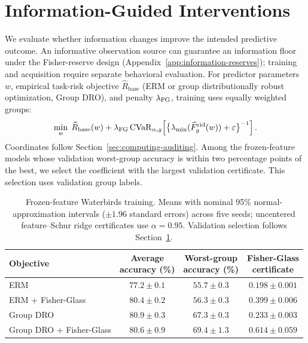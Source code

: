 \section{Information-Guided Interventions}
\label{sec:improving-information}

We evaluate whether information changes improve the intended predictive outcome. An informative observation source can guarantee an information floor under the Fisher-reserve design \citep{mansouri_arai_2026_fisher_glasses} (Appendix~\ref{app:information-reserves}); training and acquisition require separate behavioral evaluation. For predictor parameters $w$, empirical task-risk objective $\widehat R_{\mathrm{base}}$ (ERM or group distributionally robust optimization, Group DRO), and penalty $\lambda_{\mathrm{FG}}$, training uses equally weighted groups:
\begin{equation}
\min_w\;\widehat R_{\mathrm{base}}(w)
+\lambda_{\mathrm{FG}}\operatorname{CVaR}_{\alpha,g}
\!\left[\bigl\{\lambda_{\min}(\widehat F_g^{\mathrm{rid}}(w))+\varepsilon\bigr\}^{-1}\right].
\label{eq:fg-training-compact}
\end{equation}
Coordinates follow Section~\ref{sec:computing-auditing}. Among the frozen-feature models whose validation worst-group accuracy is within two percentage points of the best, we select the coefficient with the largest validation certificate. This selection uses validation group labels.

\begin{table}[htbp]
\centering
\caption{Frozen-feature Waterbirds training. Means with nominal 95\% normal-approximation intervals ($\pm1.96$ standard errors) across five seeds; uncentered feature--Schur ridge certificates use $\alpha=0.95$. Validation selection follows Section~\ref{sec:improving-information}.}
\label{tab:frozen-training}
\small
\begin{tabular}{@{}lccc@{}}
\toprule
Objective & \shortstack{Average\\accuracy (\%)} & \shortstack{Worst-group\\accuracy (\%)} & \shortstack{Fisher-Glass\\certificate} \\
\midrule
ERM & $77.2\pm0.1$ & $55.7\pm0.3$ & $0.198\pm0.001$ \\
ERM + Fisher-Glass & $80.4\pm0.2$ & $56.3\pm0.3$ & $0.399\pm0.006$ \\
Group DRO & $80.9\pm0.3$ & $67.3\pm0.3$ & $0.233\pm0.003$ \\
Group DRO + Fisher-Glass & $80.6\pm0.9$ & $69.4\pm1.3$ & $0.614\pm0.059$ \\
\bottomrule
\end{tabular}
\end{table}

